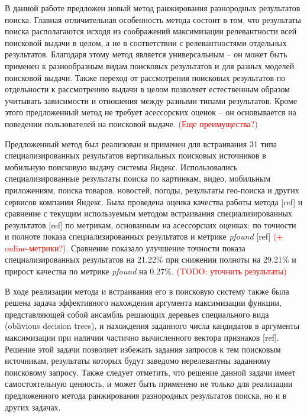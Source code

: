 \documentclass[12pt,a4paper]{report}
\newcommand\note[1]{\textcolor{red}{(#1)}}
\newcommand\todonote[1]{\note{TODO: #1}}
\begin{document}
В данной работе предложен новый метод ранжирования разнородных результатов поиска. Главная отличительная особенность метода состоит в том, что результаты поиска располагаются исходя из соображений максимизации релевантности всей поисковой выдачи в целом, а не в соответствии с релевантностями отдельных результатов. Благодаря этому метод является универсальным -- он может быть применен к разнообразным видам поисковых результатов и для разных моделей поисковой выдачи. Также переход от рассмотрения поисковых результатов по отдельности к рассмотрению выдачи в целом позволяет естественным образом учитывать зависимости и отношения между разными типами результатов. Кроме этого предложенный метод не требует асессорских оценок -- он основывается на поведении пользователей на поисковой выдаче. \note{Еще преимущества?}

%


Предложенный метод был реализован и применен для встраивания 31 типа специализированных результатов вертикальных поисковых источников в мобильную поисковую выдачу системы Яндекс. Использовались специализированные результаты поиска по картинкам, видео, мобильным приложениям, поиска товаров, новостей, погоды, результаты гео-поиска и других сервисов компании Яндекс. Была проведена оценка качества работы метода [ref] и сравнение с текущим используемым методом встраивания специализированных результатов [ref] по метрикам, основанным на асессорских оценках:  по точности и полноте показа специализированных результатов и метрике \textit{pfound} [ref] \note{+ online-метрики?}. Сравнение показало улучшение точности показа специализированных результатов на 21.22\% при снижении полноты на 29.21\% и прирост качества по метрике \textit{pfound} на 0.27\%. \todonote{уточнить результаты}

В ходе реализации метода и встраивания его в поисковую систему также была решена задача эффективного нахождения аргумента максимизации функции, представляющей собой ансамбль решающих деревьев специального вида (oblivious decision trees), и нахождения заданного числа кандидатов в аргументы максимизации при наличии частично вычисленного вектора признаков [ref]. Решение этой задачи позволяет избежать задания запросов к тем поисковым источникам, результаты которых будут заведомо нерелевантны заданному поисковому запросу. Также следует отметить, что решение данной задачи имеет самостоятельную ценность, и может быть применено не только для реализации предложенного метода ранжирования разнородных результатов поиска, но и в других задачах.
\end{document}
